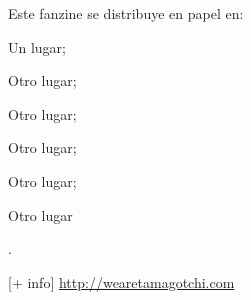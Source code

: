 \begin{flushleft}
\vspace{1.0\baselineskip}

Este fanzine se distribuye en papel en:
\begin{linelist}
\item Un lugar;
\item Otro lugar;
\item Otro lugar;
\item Otro lugar;
\item Otro lugar;
\item Otro lugar
\end{linelist}.

\end{flushleft}

\vspace*{\fill}

\begin{flushright}\footnotesize
[+ info]\linebreak
\url{http://wearetamagotchi.com}
\end{flushright}

\rmfamily
\clearpage
